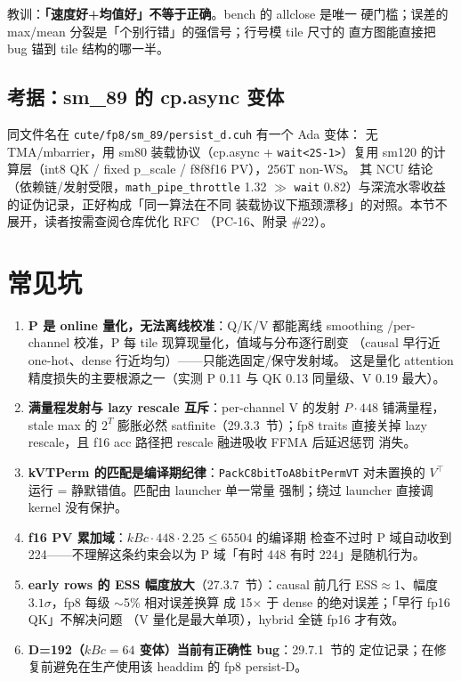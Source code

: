 教训：\textbf{「速度好+均值好」不等于正确}。bench 的 allclose 是唯一
硬门槛；误差的 max/mean 分裂是「个别行错」的强信号；行号模 tile 尺寸的
直方图能直接把 bug 锚到 tile 结构的哪一半。

\subsection{考据：sm\_89 的 cp.async 变体}

同文件名在 \texttt{cute/fp8/sm\_89/persist\_d.cuh} 有一个 Ada 变体：
无 TMA/mbarrier，用 sm80 装载协议（cp.async + \texttt{wait<2S-1>}）复用
sm120 的计算层（int8 QK / fixed p\_scale / f8f8f16 PV），256T non-WS。
其 NCU 结论（依赖链/发射受限，\texttt{math\_pipe\_throttle} 1.32 $\gg$
\texttt{wait} 0.82）与深流水零收益的证伪记录，正好构成「同一算法在不同
装载协议下瓶颈漂移」的对照。本节不展开，读者按需查阅仓库优化 RFC
（PC-16、附录 \#22）。

\section{常见坑}

\begin{enumerate}[itemsep=1pt,topsep=2pt]
  \item \textbf{P 是 online 量化，无法离线校准}：Q/K/V 都能离线 smoothing
        /per-channel 校准，P 每 tile 现算现量化，值域与分布逐行剧变
        （causal 早行近 one-hot、dense 行近均匀）——只能选固定/保守发射域。
        这是量化 attention 精度损失的主要根源之一（实测 P 0.11 与 QK 0.13
        同量级、V 0.19 最大）。
  \item \textbf{满量程发射与 lazy rescale 互斥}：per-channel V 的发射
        $P\cdot448$ 铺满量程，stale max
        的 $2^T$ 膨胀必然 satfinite（29.3.3~节）；fp8 traits 直接关掉
        lazy rescale，且 f16 acc 路径把 rescale 融进吸收 FFMA 后延迟惩罚
        消失。
  \item \textbf{kVTPerm 的匹配是编译期纪律}：\texttt{PackC8bitToA8bitPermVT}
        对未置换的 $V^{\top}$ 运行 = 静默错值。匹配由 launcher 单一常量
        强制；绕过 launcher 直接调 kernel 没有保护。
  \item \textbf{f16 PV 累加域}：$kBc\cdot448\cdot2.25\le65504$ 的编译期
        检查不过时 P 域自动收到 224——不理解这条约束会以为 P 域「有时
        448 有时 224」是随机行为。
  \item \textbf{early rows 的 ESS 幅度放大}（27.3.7~节）：causal 前几行
        ESS$\approx$1、幅度 $3.1\sigma$，fp8 每级 $\sim$5\% 相对误差换算
        成 15$\times$ 于 dense 的绝对误差；「早行 fp16 QK」不解决问题
        （V 量化是最大单项），hybrid 全链 fp16 才有效。
  \item \textbf{D=192（$kBc{=}64$ 变体）当前有正确性 bug}：29.7.1~节的
        定位记录；在修复前避免在生产使用该 headdim 的 fp8 persist-D。
\end{enumerate}

